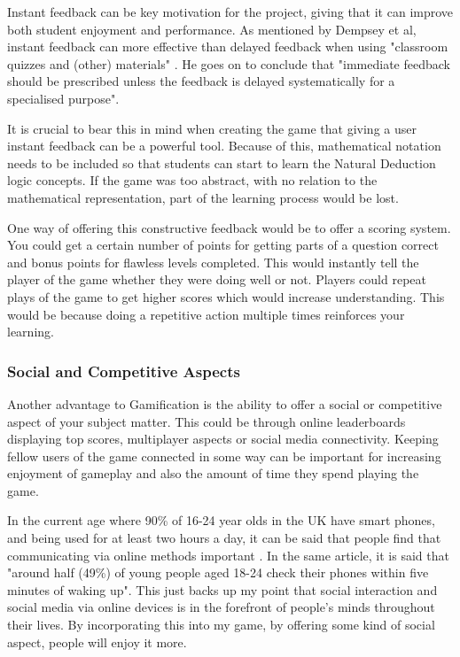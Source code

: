 \documentclass[a4paper]{article}
\begin{document}
Instant feedback can be key motivation for the project, giving that it can improve both student enjoyment and performance. As mentioned by Dempsey et al, instant feedback can more effective than delayed feedback when using "classroom quizzes and (other) materials" \cite{dempsey1993text}. He goes on to conclude that "immediate feedback should be prescribed unless the feedback is delayed systematically for a specialised purpose". 

It is crucial to bear this in mind when creating the game that giving a user instant feedback can be a powerful tool. Because of this, mathematical notation needs to be included so that students can start to learn the Natural Deduction logic concepts. If the game was too abstract, with no relation to the mathematical representation, part of the learning process would be lost.

One way of offering this constructive feedback would be to offer a scoring system. You could get a certain number of points for getting parts of a question correct and bonus points for flawless levels completed. This would instantly tell the player of the game whether they were doing well or not. Players could repeat plays of the game to get higher scores which would increase understanding. This would be because doing a repetitive action multiple times reinforces your learning.

\subsubsection{Social and Competitive Aspects}
Another advantage to Gamification is the ability to offer a social or competitive aspect of your subject matter. This could be through online leaderboards displaying top scores, multiplayer aspects or social media connectivity. Keeping fellow users of the game connected in some way can be important for increasing enjoyment of gameplay and also the amount of time they spend playing the game.

In the current age where 90\% of 16-24 year olds in the UK have smart phones, and being used for at least two hours a day, it can be said that people find that communicating via online methods important \cite{2015Ofcom}. In the same article, it is said that "around half (49\%) of young people aged 18-24 check their phones within five minutes of waking up". This just backs up my point that social interaction and social media via online devices is in the forefront of people's minds throughout their lives. By incorporating this into my game, by offering some kind of social aspect, people will enjoy it more. 
\end{document}
